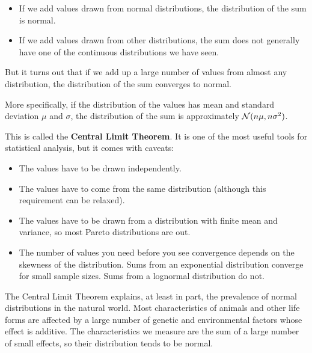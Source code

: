 \documentclass[12pt]{book}
\begin{document}
\begin{itemize}

\item If we add values drawn from normal distributions, the distribution
of the sum is normal.

\item If we add values drawn from other distributions, the sum does not
generally have one of the continuous distributions we have seen.

\end{itemize}

But it turns out that if we add up a large number of values from
almost any distribution, the distribution of the sum converges to
normal.

More specifically, if the distribution of the values has mean and
standard deviation $\mu$ and $\sigma$, the distribution of the sum is
approximately $\mathcal{N}(n \mu, n \sigma^2)$.

This is called the {\bf Central Limit Theorem}.  It is one of the
most useful tools for statistical analysis, but it comes with
caveats:

\begin{itemize}

\item The values have to be drawn independently.

\item The values have to come from the same distribution (although
  this requirement can be relaxed).

\item The values have to be drawn
  from a distribution with finite mean and variance, so most Pareto
  distributions are out.

\item The number of values you need before you see convergence depends
  on the skewness of the distribution.  Sums from an exponential
  distribution converge for small sample sizes.  Sums from a
  lognormal distribution do not.

\end{itemize}


The Central Limit Theorem explains, at least in part, the prevalence
of normal distributions in the natural world.  Most characteristics of
animals and other life forms are affected by a large number of genetic
and environmental factors whose effect is additive.  The characteristics
we measure are the sum of a large number of small effects, so their
distribution tends to be normal.
\end{document}
